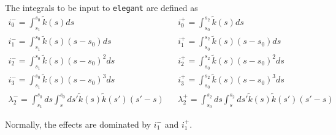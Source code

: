 The integrals to be input to {\tt elegant} are defined as 
\begin{eqnarray}
i_0^- = \int_{s_1}^{s_0} \tilde{k}(s) ds & & i_0^+ = \int_{s_0}^{s_2} \tilde{k}(s) ds \\
i_1^- = \int_{s_1}^{s_0} \tilde{k}(s) (s-s_0) ds & & i_1^+ = \int_{s_0}^{s_2} \tilde{k}(s) (s-s_0) ds \\
i_2^- = \int_{s_1}^{s_0} \tilde{k}(s) (s-s_0)^2 ds & & i_2^+ = \int_{s_0}^{s_2} \tilde{k}(s) (s-s_0)^2 ds \\
i_3^- = \int_{s_1}^{s_0} \tilde{k}(s) (s-s_0)^3 ds & & i_3^+ = \int_{s_0}^{s_2} \tilde{k}(s) (s-s_0)^3 ds \\
\lambda_2^- = \int_{s_1}^{s_0} ds \int_s^{s_0} ds\prime \tilde{k}(s) \tilde{k}(s\prime) (s\prime-s) & & 
\lambda_2^+ = \int_{s_0}^{s_2} ds \int_s^{s_2} ds\prime \tilde{k}(s) \tilde{k}(s\prime) (s\prime-s) 
\end{eqnarray}

Normally, the effects are dominated by $i_1^-$ and $i_1^+$.  
